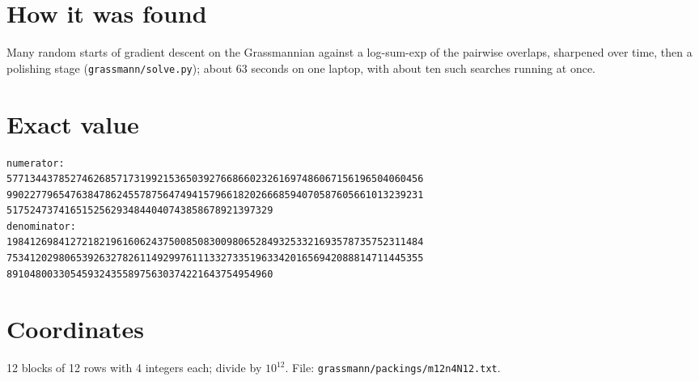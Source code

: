 \documentclass[11pt,a4paper]{article}
\begin{document}
\section{How it was found}
Many random starts of gradient descent on the Grassmannian against a log-sum-exp of the pairwise overlaps, sharpened over time, then a polishing stage (\texttt{grassmann/solve.py}); about 63 seconds on one laptop, with about ten such searches running at once.


\appendix
\section{Exact value}
{\small
\begin{verbatim}
numerator:
577134437852746268571731992153650392766866023261697486067156196504060456
990227796547638478624557875647494157966182026668594070587605661013239231
5175247374165152562934844040743858678921397329
denominator:
198412698412721821961606243750085083009806528493253321693578735752311484
753412029806539263278261149299761113327335196334201656942088814711445355
8910480033054593243558975630374221643754954960
\end{verbatim}}

\section{Coordinates}
12 blocks of 12 rows with 4 integers each; divide by $10^{12}$. File: \texttt{grassmann/packings/m12n4N12.txt}.
{\tiny
\begin{multicols}{3}
\end{multicols}}
\end{document}
